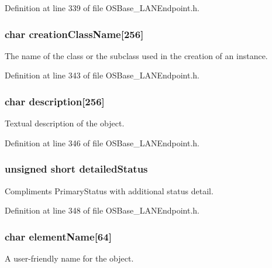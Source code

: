 Definition at line 339 of file OSBase\_\-LANEndpoint.h.\hypertarget{struct_l_a_n_endpoint_a264b859577affb8c648bb0dea4f42a76}{
\subsubsection[{creationClassName}]{\setlength{\rightskip}{0pt plus 5cm}char {\bf creationClassName}\mbox{[}256\mbox{]}}}
\label{struct_l_a_n_endpoint_a264b859577affb8c648bb0dea4f42a76}
The name of the class or the subclass used in the creation of an instance. 

Definition at line 343 of file OSBase\_\-LANEndpoint.h.\hypertarget{struct_l_a_n_endpoint_a18afc38b5c05344b661e1b3b01c1d0e5}{
\subsubsection[{description}]{\setlength{\rightskip}{0pt plus 5cm}char {\bf description}\mbox{[}256\mbox{]}}}
\label{struct_l_a_n_endpoint_a18afc38b5c05344b661e1b3b01c1d0e5}
Textual description of the object. 

Definition at line 346 of file OSBase\_\-LANEndpoint.h.\hypertarget{struct_l_a_n_endpoint_ad90b9e45caede4967b5412b9f8be047c}{
\subsubsection[{detailedStatus}]{\setlength{\rightskip}{0pt plus 5cm}unsigned short {\bf detailedStatus}}}
\label{struct_l_a_n_endpoint_ad90b9e45caede4967b5412b9f8be047c}
Compliments PrimaryStatus with additional status detail. 

Definition at line 348 of file OSBase\_\-LANEndpoint.h.\hypertarget{struct_l_a_n_endpoint_a1c9372777e720027e94df62b3274a7fb}{
\subsubsection[{elementName}]{\setlength{\rightskip}{0pt plus 5cm}char {\bf elementName}\mbox{[}64\mbox{]}}}
\label{struct_l_a_n_endpoint_a1c9372777e720027e94df62b3274a7fb}
A user-\/friendly name for the object. 

